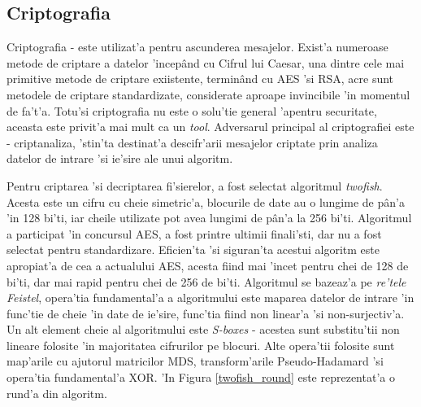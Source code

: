 \documentclass[12pt,a4paper,twoside]{report}
\begin{document}
\subsection{Criptografia}
Criptografia - este utilizat'a pentru ascunderea mesajelor. Exist'a numeroase metode de criptare a datelor 'incepând cu Cifrul lui Caesar, una dintre cele mai primitive metode de criptare exiistente, terminând cu AES 'si RSA, acre sunt metodele de criptare standardizate, considerate aproape invincibile 'in momentul de fa't'a. Totu'si criptografia nu este o solu'tie general 'apentru securitate, aceasta este privit'a mai mult ca un \textit{tool}. Adversarul principal al criptografiei este - criptanaliza, 'stin'ta destinat'a descifr'arii mesajelor criptate prin analiza datelor de intrare 'si ie'sire ale unui algoritm.

Pentru criptarea 'si decriptarea fi'sierelor, a fost selectat algoritmul \textit{twofish}\cite{two_fish_papper}. Acesta este un cifru cu cheie simetric'a, blocurile de date au o lungime de pân'a 'in 128 bi'ti, iar cheile utilizate pot avea lungimi de pân'a la 256 bi'ti. Algoritmul a participat 'in concursul AES, a fost printre ultimii finali'sti, dar nu a fost selectat pentru standardizare. Eficien'ta 'si siguran'ta acestui algoritm este apropiat'a de cea a actualului AES, acesta fiind mai 'incet pentru chei de 128 de bi'ti, dar mai rapid pentru chei de 256 de bi'ti. Algoritmul se bazeaz'a pe \textit{re'tele Feistel}, opera'tia fundamental'a a algoritmului este maparea datelor de intrare 'in func'tie de cheie 'in date de ie'sire, func'tia fiind non linear'a 'si non-surjectiv'a. Un alt element cheie al algoritmului este \textit{S-boxes} - acestea sunt substitu'tii non lineare folosite 'in majoritatea cifrurilor pe blocuri. Alte opera'tii folosite sunt map'arile cu ajutorul matricilor MDS, transform'arile Pseudo-Hadamard  'si opera'tia fundamental'a XOR. 'In Figura \ref{twofish_round} este reprezentat'a o rund'a din algoritm.
\end{document}
